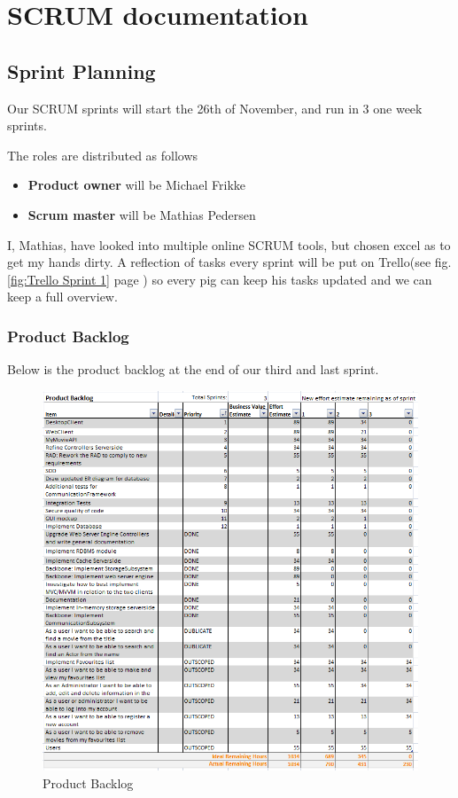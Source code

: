 \chapter{SCRUM documentation}

\section{Sprint Planning}

Our SCRUM sprints will start the 26th of November, and run in 3 one week sprints.

The roles are distributed as follows

\begin{itemize}
\item \textbf{Product owner} will be Michael Frikke
\item \textbf{Scrum master} will be Mathias Pedersen
\end{itemize}

I, Mathias, have looked into multiple online SCRUM tools, but chosen excel as to get my hands dirty. A reflection of tasks every sprint will be put on Trello(see fig. \ref{fig:Trello Sprint 1} page \pageref{fig:Trello Sprint 1}) so every pig can keep his tasks updated and we can keep a full overview.

\subsection{Product Backlog}
\label{sec:Product Backlog}
Below is the product backlog at the end of our third and last sprint.

\begin{figure}[H]
\includegraphics[scale=0.75]{img/SCRUM/productBacklog.PNG}
\caption{Product Backlog}
\label{fig:Product Backlog}
\end{figure}


